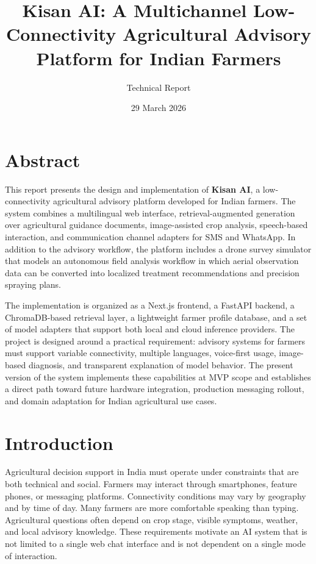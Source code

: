 \documentclass[11pt,a4paper]{article}
\title{\textbf{Kisan AI}: A Multichannel Low-Connectivity Agricultural Advisory Platform for Indian Farmers}
\author{Technical Report}
\date{29 March 2026}
\begin{document}
\maketitle
\tableofcontents
\newpage

\section{Abstract}

This report presents the design and implementation of \textbf{Kisan AI}, a low-connectivity agricultural advisory platform developed for Indian farmers. The system combines a multilingual web interface, retrieval-augmented generation over agricultural guidance documents, image-assisted crop analysis, speech-based interaction, and communication channel adapters for SMS and WhatsApp. In addition to the advisory workflow, the platform includes a drone survey simulator that models an autonomous field analysis workflow in which aerial observation data can be converted into localized treatment recommendations and precision spraying plans.

The implementation is organized as a Next.js frontend, a FastAPI backend, a ChromaDB-based retrieval layer, a lightweight farmer profile database, and a set of model adapters that support both local and cloud inference providers. The project is designed around a practical requirement: advisory systems for farmers must support variable connectivity, multiple languages, voice-first usage, image-based diagnosis, and transparent explanation of model behavior. The present version of the system implements these capabilities at MVP scope and establishes a direct path toward future hardware integration, production messaging rollout, and domain adaptation for Indian agricultural use cases.

\section{Introduction}

Agricultural decision support in India must operate under constraints that are both technical and social. Farmers may interact through smartphones, feature phones, or messaging platforms. Connectivity conditions may vary by geography and by time of day. Many farmers are more comfortable speaking than typing. Agricultural questions often depend on crop stage, visible symptoms, weather, and local advisory knowledge. These requirements motivate an AI system that is not limited to a single web chat interface and is not dependent on a single mode of interaction.
\end{document}
